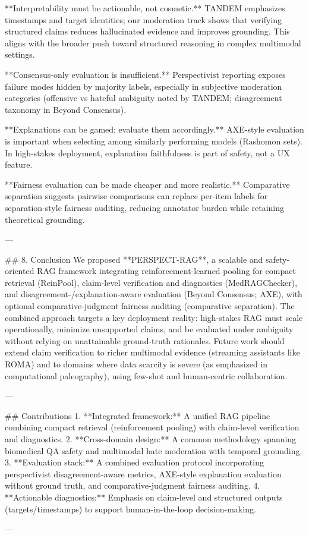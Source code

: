 **Interpretability must be actionable, not cosmetic.** TANDEM emphasizes timestamps and target identities; our moderation track shows that verifying structured claims reduces hallucinated evidence and improves grounding. This aligns with the broader push toward structured reasoning in complex multimodal settings.

**Consensus-only evaluation is insufficient.** Perspectivist reporting exposes failure modes hidden by majority labels, especially in subjective moderation categories (offensive vs hateful ambiguity noted by TANDEM; disagreement taxonomy in Beyond Consensus).

**Explanations can be gamed; evaluate them accordingly.** AXE-style evaluation is important when selecting among similarly performing models (Rashomon sets). In high-stakes deployment, explanation faithfulness is part of safety, not a UX feature.

**Fairness evaluation can be made cheaper and more realistic.** Comparative separation suggests pairwise comparisons can replace per-item labels for separation-style fairness auditing, reducing annotator burden while retaining theoretical grounding.

---

## 8. Conclusion  
We proposed **PERSPECT-RAG**, a scalable and safety-oriented RAG framework integrating reinforcement-learned pooling for compact retrieval (ReinPool), claim-level verification and diagnostics (MedRAGChecker), and disagreement-/explanation-aware evaluation (Beyond Consensus; AXE), with optional comparative-judgment fairness auditing (comparative separation). The combined approach targets a key deployment reality: high-stakes RAG must scale operationally, minimize unsupported claims, and be evaluated under ambiguity without relying on unattainable ground-truth rationales. Future work should extend claim verification to richer multimodal evidence (streaming assistants like ROMA) and to domains where data scarcity is severe (as emphasized in computational paleography), using few-shot and human-centric collaboration.

---

## Contributions  
1. **Integrated framework:** A unified RAG pipeline combining compact retrieval (reinforcement pooling) with claim-level verification and diagnostics.  
2. **Cross-domain design:** A common methodology spanning biomedical QA safety and multimodal hate moderation with temporal grounding.  
3. **Evaluation stack:** A combined evaluation protocol incorporating perspectivist disagreement-aware metrics, AXE-style explanation evaluation without ground truth, and comparative-judgment fairness auditing.  
4. **Actionable diagnostics:** Emphasis on claim-level and structured outputs (targets/timestamps) to support human-in-the-loop decision-making.

---